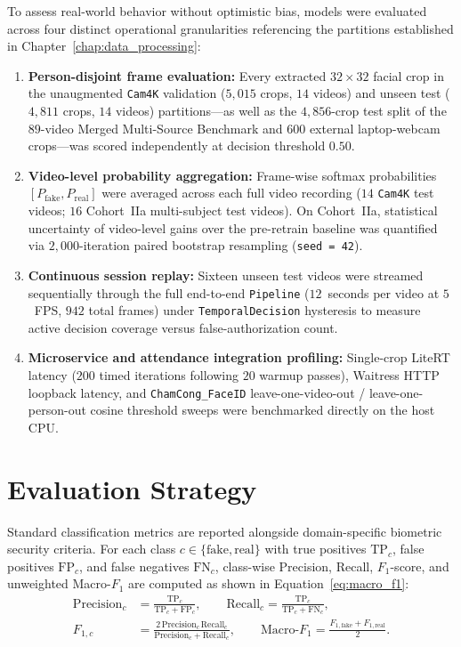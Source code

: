 To assess real-world behavior without optimistic bias, models were evaluated across four distinct operational granularities referencing the partitions established in Chapter~\ref{chap:data_processing}:
\begin{enumerate}
    \item \textbf{Person-disjoint frame evaluation:} Every extracted $32\times32$ facial crop in the unaugmented \texttt{Cam4K} validation ($5{,}015$ crops, $14$ videos) and unseen test ($4{,}811$ crops, $14$ videos) partitions---as well as the $4{,}856$-crop test split of the $89$-video Merged Multi-Source Benchmark and $600$ external laptop-webcam crops---was scored independently at decision threshold $0.50$.
    \item \textbf{Video-level probability aggregation:} Frame-wise softmax probabilities $[P_{\text{fake}}, P_{\text{real}}]$ were averaged across each full video recording ($14$ \texttt{Cam4K} test videos; $16$ Cohort~IIa multi-subject test videos). On Cohort~IIa, statistical uncertainty of video-level gains over the pre-retrain baseline was quantified via $2{,}000$-iteration paired bootstrap resampling (\texttt{seed = 42}).
    \item \textbf{Continuous session replay:} Sixteen unseen test videos were streamed sequentially through the full end-to-end \texttt{Pipeline} ($12$~seconds per video at $5$~FPS, $942$ total frames) under \texttt{TemporalDecision} hysteresis to measure active decision coverage versus false-authorization count.
    \item \textbf{Microservice and attendance integration profiling:} Single-crop LiteRT latency ($200$ timed iterations following $20$ warmup passes), Waitress HTTP loopback latency, and \texttt{ChamCong\_FaceID} leave-one-video-out / leave-one-person-out cosine threshold sweeps were benchmarked directly on the host CPU.
\end{enumerate}

\section{Evaluation Strategy}
\label{sec:evaluation_strategy}

Standard classification metrics are reported alongside domain-specific biometric security criteria. For each class $c \in \{\text{fake}, \text{real}\}$ with true positives $\text{TP}_c$, false positives $\text{FP}_c$, and false negatives $\text{FN}_c$, class-wise Precision, Recall, $F_1$-score, and unweighted Macro-$F_1$ are computed as shown in Equation~\eqref{eq:macro_f1}:
\begin{equation}
\label{eq:macro_f1}
\begin{aligned}
    \text{Precision}_c &= \frac{\text{TP}_c}{\text{TP}_c + \text{FP}_c}, \qquad
    \text{Recall}_c = \frac{\text{TP}_c}{\text{TP}_c + \text{FN}_c}, \\
    F_{1,c} &= \frac{2\,\text{Precision}_c\,\text{Recall}_c}{\text{Precision}_c + \text{Recall}_c}, \qquad
    \text{Macro-}F_1 = \frac{F_{1,\text{fake}} + F_{1,\text{real}}}{2}.
\end{aligned}
\end{equation}

